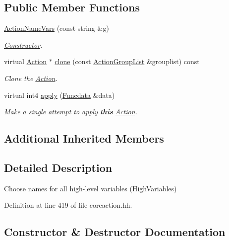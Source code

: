 \subsection*{Public Member Functions}
\begin{DoxyCompactItemize}
\item 
\mbox{\hyperlink{class_action_name_vars_a90f4bef1bf5d7bbc1a1b0399d9c102fe}{Action\+Name\+Vars}} (const string \&g)
\begin{DoxyCompactList}\small\item\em \mbox{\hyperlink{class_constructor}{Constructor}}. \end{DoxyCompactList}\item 
virtual \mbox{\hyperlink{class_action}{Action}} $\ast$ \mbox{\hyperlink{class_action_name_vars_a93b62205bd339268977f7ae15f665eef}{clone}} (const \mbox{\hyperlink{class_action_group_list}{Action\+Group\+List}} \&grouplist) const
\begin{DoxyCompactList}\small\item\em Clone the \mbox{\hyperlink{class_action}{Action}}. \end{DoxyCompactList}\item 
virtual int4 \mbox{\hyperlink{class_action_name_vars_aac0b5f8eea942d73f9fcdb4fca44f1bd}{apply}} (\mbox{\hyperlink{class_funcdata}{Funcdata}} \&data)
\begin{DoxyCompactList}\small\item\em Make a single attempt to apply {\bfseries{this}} \mbox{\hyperlink{class_action}{Action}}. \end{DoxyCompactList}\end{DoxyCompactItemize}
\subsection*{Additional Inherited Members}


\subsection{Detailed Description}
Choose names for all high-\/level variables (High\+Variables) 

Definition at line 419 of file coreaction.\+hh.



\subsection{Constructor \& Destructor Documentation}
\mbox{\label{class_action_name_vars_a90f4bef1bf5d7bbc1a1b0399d9c102fe}} 
